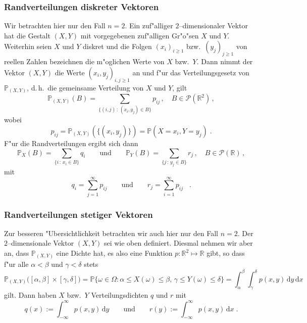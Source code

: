 \documentclass[ngerman,draft,parskip=half,twoside]{scrartcl}
\newcommand*{\R}{\mathbb{R}}      %
\newcommand*{\PotM}{\mathcal{P}}    %
\newcommand*{\WKM}{\mathbb{P}}      %
\begin{document}
\subsubsection{Randverteilungen diskreter Vektoren}
\label{disk}
Wir betrachten hier nur den Fall $n=2$. Ein zuf"alliger $2$--dimensionaler Vektor hat die Gestalt
$(X,Y)$ mit vorgegebenen zuf"alligen Gr"o"sen $X$ und $Y$. Weiterhin seien $X$ und $Y$ diskret und die
Folgen
$(x_i)_{i\ge 1}$ bzw.~$(y_j)_{j\ge 1}$ von reellen Zahlen bezeichnen  die m"oglichen Werte von $X$ bzw.~$Y$.
Dann nimmt der Vektor $(X,Y)$ die Werte $(x_i,y_j)_{i,j\ge 1}$ an und f"ur das Verteilungsgesetz
von $\WKM_{(X,Y)}$, d.\,h.~die gemeinsame Verteilung von $X$ und $Y$, gilt
$$
\WKM_{(X,Y)}(B)=\sum_{\{(i,j)\,:\, (x_i,y_j)\in B\}} p_{ij}\,,\quad B\in\PotM(\R^2)\,,
$$
wobei
$$
p_{ij}= \WKM_{(X,Y)}(\{(x_i,y_j)\})=\WKM(X=x_i,Y=y_j)\;.
$$
F"ur die Randverteilungen ergibt sich dann
$$
\WKM_X(B)=\sum_{\{i\,:\,x_i\in B\}} q_i \qquad\mbox{und}\qquad
\WKM_Y(B)=\sum_{\{j\,:\,y_j\in B\}} r_j\,,\quad B\in\PotM(\R)\,,
$$
mit
$$
q_i=\sum_{j=1}^\infty p_{ij}\qquad\mbox{und}\qquad r_j=\sum_{i=1}^\infty p_{ij}\;\;\;.
$$
\subsubsection{Randverteilungen stetiger Vektoren}
\label{stet}
Zur besseren "Ubersichtlichkeit betrachten wir auch hier nur den Fall $n=2$. Der
$2$--dimensionale Vektor $(X,Y)$ sei wie oben definiert. Diesmal nehmen wir aber an, dass
$\WKM_{(X,Y)}$ eine Dichte hat, es also eine Funktion $p \colon\R^2\mapsto\R$ gibt, so
dass f"ur alle $\alpha<\beta$ und $\gamma<\delta$ stets
$$
\WKM_{(X,Y)}\big([\alpha,\beta]\times[\gamma,\delta]\big)
=\WKM\{\omega\in \Omega : \alpha\le X(\omega)\le\beta,\,\gamma\le Y(\omega)\le\delta\}
=\int_\alpha^\beta\int_\gamma^\delta p(x,y)\,\mathrm d y \,\mathrm d x
$$
gilt. Dann haben $X$ bzw.~$Y$ Verteilungsdichten $q$ und $r$ mit
$$
q(x):=\int_{-\infty}^\infty p(x,y)\,\mathrm d y\qquad\mbox{und}\qquad
r(y):=\int_{-\infty}^\infty p(x,y)\,\mathrm d x\;.
$$
\end{document}
